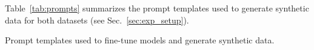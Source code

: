 Table~\ref{tab:prompts} summarizes the prompt templates \prompt{\ell} used to generate synthetic data for both datasets (see Sec.~\ref{sec:exp_setup}). 

\begin{table}[ht]
    \centering
    
    \caption{Prompt templates used to fine-tune models and generate synthetic data.}
    \label{tab:prompts}
\end{table}
